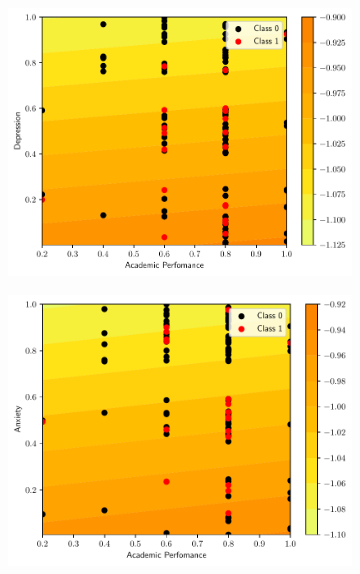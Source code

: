 \documentclass[conference]{IEEEtran}
\theoremstyle{definition}
\theoremstyle{remark}
\theoremstyle{remark}
\begin{document}
\begin{figure}
    \begin{subfigure}[b]{0.32\textwidth}
        \centering
        \includegraphics[width=\textwidth]{figs/svm-linear-contour-1-3.pdf}
        \caption{}
    \end{subfigure}
    \begin{subfigure}[b]{0.32\textwidth}
        \centering
        \includegraphics[width=\textwidth]{figs/svm-linear-contour-1-4.pdf}
        \caption{}
    \end{subfigure}
    \begin{subfigure}[b]{0.32\textwidth}
        \centering

\end{subfigure}
\end{figure}
\end{document}

